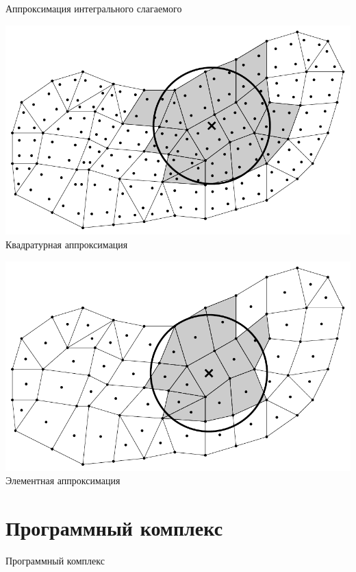 \begin{frame}{Аппроксимация интегрального слагаемого}
\begin{minipage}[b][][b]{0.49\textwidth}
	\centering
	\includegraphics[width=\textwidth]{pics/ApproxSQ.pdf}
	Квадратурная аппроксимация
\end{minipage}
\hfill
\begin{minipage}[b][][b]{0.49\textwidth}
	\centering
	\includegraphics[width=\textwidth]{pics/ApproxSE.pdf}
	Элементная аппроксимация
\end{minipage}
\end{frame}

\section{Программный комплекс}

\begin{frame}
	\centering
	\Huge
	Программный комплекс
\end{frame}

